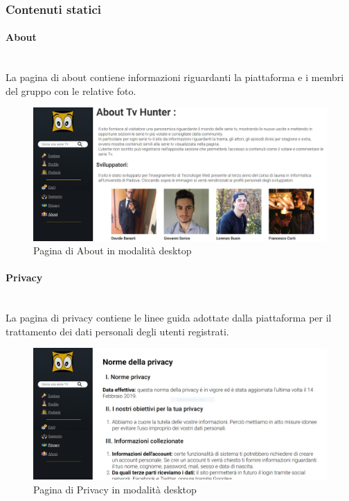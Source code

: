 \subsubsection{Contenuti statici}

\paragraph{About} 
~\\	
La pagina di about contiene informazioni riguardanti la piattaforma e i membri del gruppo con le relative foto. 
\begin{figure}[H]
	\centerline{\includegraphics[scale=0.16]{img/about.png}}
	\caption{Pagina di About in modalità desktop}
	\label{fig:addForm} 
\end{figure}	

\paragraph{Privacy} 
~\\	
La pagina di privacy contiene le linee guida adottate dalla piattaforma per il trattamento dei dati personali degli utenti registrati.
\begin{figure}[h!]
	\centerline{\includegraphics[scale=0.16]{img/privacy.png}}
	\caption{Pagina di Privacy in modalità desktop}
	\label{fig:addForm} 
\end{figure}

